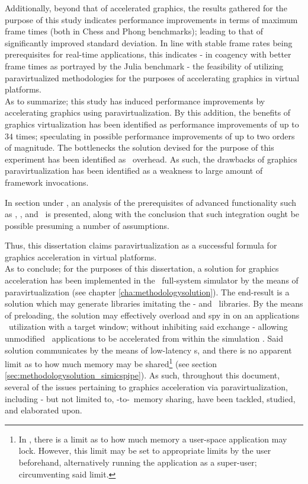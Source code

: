 Additionally, beyond that of accelerated graphics, the results gathered for the purpose of this study indicates performance improvements in terms of maximum frame times (both in Chess and Phong benchmarks); leading to that of significantly improved standard deviation.
In line with stable frame rates being prerequisites for real-time applications, this indicates - in coagency with better frame times as portrayed by the Julia benchmark - the feasibility of utilizing paravirtualized methodologies for the purposes of accelerating graphics in virtual platforms.\\

\noindent
As to summarize; this study has induced performance improvements by accelerating graphics using paravirtualization.
By this addition, the benefits of graphics virtualization has been identified as performance improvements of up to $34$ times; speculating in possible performance improvements of up to two orders of magnitude.
The bottlenecks the solution devised for the purpose of this experiment has been identified as \dvttermmagicinstruction\ overhead.
As such, the drawbacks of graphics paravirtualization has been identified as a weakness to large amount of framework invocations.

In section  under , an analysis of the prerequisites of advanced functionality such as \dvttermdeterministicexecution , \dvttermcheckpointing, and \dvttermreverseexecution\ is presented, along with the conclusion that such integration ought be possible presuming a number of assumptions.

Thus, this dissertation claims paravirtualization as a successful formula for graphics acceleration in virtual platforms.\\

\noindent
As to conclude; for the purposes of this dissertation, a solution for graphics acceleration has been implemented in the \dvttermsimics\ full-system simulator by the means of paravirtualization (see chapter \ref{cha:methodologysolution}).
The end-result is a solution which may generate libraries imitating the \dvttermegl - and \dvttermopenglestwopointo\ libraries.
By the means of preloading, the solution may effectively overload and spy in on an applications \dvttermegl\ utilization with a target window; without inhibiting said exchange - allowing unmodified \dvttermopengl\ applications to be accelerated from within the simulation \dvttermtarget .
Said solution communicates by the means of low-latency \dvttermmagicinstruction s, and there is no apparent limit as to how much memory may be shared\footnote{In \dvttermlinux , there is a limit as to how much memory a user-space application may lock. However, this limit may be set to appropriate limits by the user beforehand, alternatively running the application as a super-user; circumventing said limit.} (see section \ref{sec:methodologysolution_simicspipe}).
As such, throughout this document, several of the issues pertaining to graphics acceleration via paravirtualization, including - but not limited to, \dvttermtarget -to-\dvttermhost\ memory sharing, have been tackled, studied, and elaborated upon.


